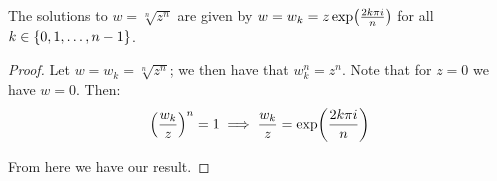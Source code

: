 \begin{theorem}
    The solutions to $w=\sqrt[n]{z^n}$ are given by $w=w_k=z\exp\paren*{\frac{2k\pi i}{n}}$ for all $k\in\{0,1,\dots,n-1\}$.

    \begin{proof}
        Let $w=w_k=\sqrt[n]{z^n}$; we then have that $w_k^n=z^n$. Note that for $z=0$ we have $w=0$. Then:
        $$
            \paren*{\frac{w_k}{z}}^n=1\implies \frac{w_k}{z}=\exp\paren*{\frac{2k\pi i}{n}}
        $$

        From here we have our result.
    \end{proof}
\end{theorem}

\begin{theorem}
\end{theorem}

\newpage